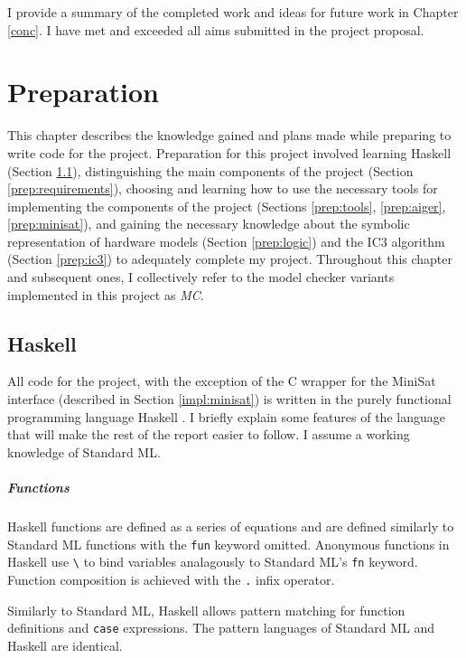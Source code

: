 \documentclass[12pt,a4paper,twoside,openright]{report}
\begin{document}
I provide a summary of the completed work and ideas for
future work in Chapter \ref{conc}. %
I have met and exceeded all aims submitted in the project proposal.

\chapter{Preparation}
\label{prep}

This chapter describes the knowledge gained and plans made while preparing
to write code for the project.
Preparation for this project involved learning
Haskell (Section \ref{prep:haskell}),
distinguishing the main components of the project
(Section \ref{prep:requirements}), choosing and learning how to use
the necessary tools for implementing the components of the project
(Sections \ref{prep:tools}, \ref{prep:aiger}, \ref{prep:minisat}),
and gaining the necessary knowledge about the symbolic representation
of hardware models
(Section \ref{prep:logic}) and the IC3 algorithm (Section \ref{prep:ic3}) to
adequately complete my project.
Throughout this chapter and subsequent ones, I collectively refer to the model checker
variants implemented in this project as \emph{MC}.

\section{Haskell}
\label{prep:haskell}

All code for the project, with the exception of the C wrapper for the
MiniSat interface (described in Section \ref{impl:minisat})
is written in the purely functional
programming language Haskell \cite{haskell}.
I briefly explain some features of the
language that will make the rest of the report easier to follow.
I assume a working knowledge of Standard ML.

\paragraph{Functions}{
Haskell functions are defined as a series of equations and
are defined similarly to Standard ML functions with the
\verb,fun, keyword omitted. Anonymous functions in Haskell
use \verb,\, to bind variables analagously to Standard
ML's \verb,fn, keyword. Function composition is achieved with the \verb,., infix operator.

Similarly to Standard ML, Haskell allows pattern matching
for function definitions and \verb,case, expressions. The pattern languages of Standard
ML and Haskell are identical.
}
\end{document}
